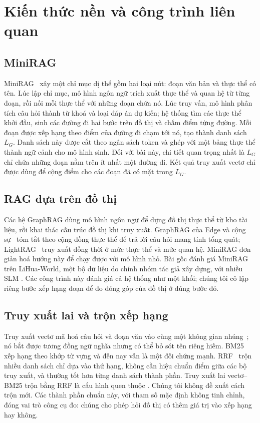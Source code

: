 \section{Kiến thức nền và công trình liên quan}\label{sec:related}

\subsection{MiniRAG}\label{sec:background}
MiniRAG~\cite{fan2025minirag} xây một chỉ mục dị thể gồm hai loại nút: đoạn văn bản và thực thể có tên.
Lúc lập chỉ mục, mô hình ngôn ngữ trích xuất thực thể và quan hệ từ từng đoạn, rồi nối mỗi thực thể với những đoạn chứa nó.
Lúc truy vấn, mô hình phân tích câu hỏi thành từ khoá và loại đáp án dự kiến; hệ thống tìm các thực thể khởi đầu, sinh các đường đi hai bước trên đồ thị và chấm điểm từng đường.
Mỗi đoạn được xếp hạng theo điểm của đường đi chạm tới nó, tạo thành danh sách $L_G$.
Danh sách này được cắt theo ngân sách token và ghép với một bảng thực thể thành ngữ cảnh cho mô hình sinh.
Đối với bài này, chi tiết quan trọng nhất là $L_G$ chỉ chứa những đoạn nằm trên ít nhất một đường đi.
Kết quả truy xuất vectơ chỉ được dùng để cộng điểm cho các đoạn đã có mặt trong $L_G$.

\subsection{RAG dựa trên đồ thị}
Các hệ GraphRAG dùng mô hình ngôn ngữ để dựng đồ thị thực thể từ kho tài liệu, rồi khai thác cấu trúc đồ thị khi truy xuất.
GraphRAG của Edge và cộng sự~\cite{edge2024graphrag} tóm tắt theo cộng đồng thực thể để trả lời câu hỏi mang tính tổng quát; LightRAG~\cite{guo2024lightrag} truy xuất đồng thời ở mức thực thể và mức quan hệ.
MiniRAG đơn giản hoá hướng này để chạy được với mô hình nhỏ.
Bài gốc đánh giá MiniRAG trên LiHua-World, một bộ dữ liệu do chính nhóm tác giả xây dựng, với nhiều SLM .
Các công trình này đánh giá cả hệ thống như một khối; chúng tôi cô lập riêng bước xếp hạng đoạn để đo đóng góp của đồ thị ở đúng bước đó.

\subsection{Truy xuất lai và trộn xếp hạng}
Truy xuất vectơ mã hoá câu hỏi và đoạn văn vào cùng một không gian nhúng~\cite{karpukhin2020dpr,reimers2019sbert}; nó bắt được tương đồng ngữ nghĩa nhưng có thể bỏ sót tên riêng hiếm.
BM25~\cite{robertson2009bm25} xếp hạng theo khớp từ vựng và đến nay vẫn là một đối chứng mạnh.
RRF~\cite{cormack2009rrf} trộn nhiều danh sách chỉ dựa vào thứ hạng, không cần hiệu chuẩn điểm giữa các bộ truy xuất, và thường tốt hơn từng danh sách thành phần.
Truy xuất lai vectơ--BM25 trộn bằng RRF là cấu hình quen thuộc .
Chúng tôi không đề xuất cách trộn mới. Các thành phần chuẩn này, với tham số mặc định không tinh chỉnh, đóng vai trò công cụ đo: chúng cho phép hỏi đồ thị có thêm giá trị vào xếp hạng hay không.

